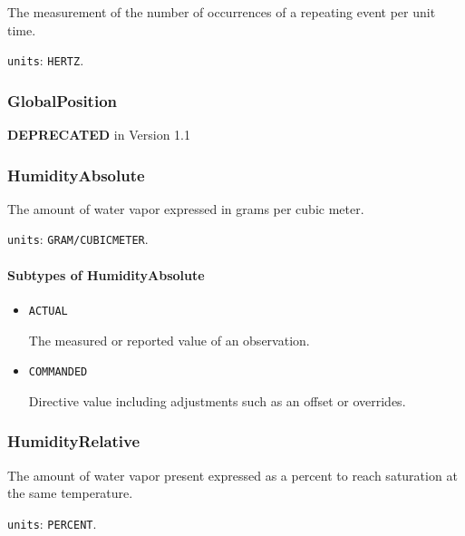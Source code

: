 The measurement of the number of occurrences of a repeating event per unit time.


\texttt{units}: \texttt{HERTZ}.


\subsubsection{GlobalPosition}
\label{sec:GlobalPosition}



\textbf{DEPRECATED} in Version 1.1



\subsubsection{HumidityAbsolute}
\label{sec:HumidityAbsolute}



The amount of water vapor expressed in grams per cubic meter.


\texttt{units}: \texttt{GRAM/CUBIC\textunderscore METER}.

\paragraph{Subtypes of HumidityAbsolute}\mbox{}
\label{sec:Subtypes of HumidityAbsolute}

\begin{itemize}

\item \texttt{ACTUAL}


The measured or reported value of an \gls{observation}.

\item \texttt{COMMANDED}


Directive value including adjustments such as an offset or overrides.


\end{itemize}





\subsubsection{HumidityRelative}
\label{sec:HumidityRelative}



The amount of water vapor present expressed as a percent to reach saturation at the same temperature.


\texttt{units}: \texttt{PERCENT}.

